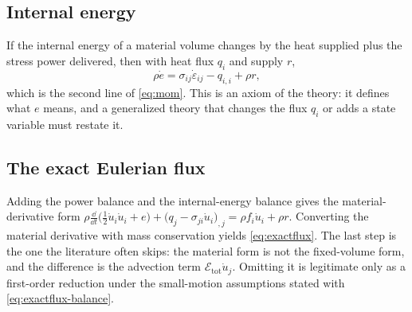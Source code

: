 \subsection*{Internal energy}\label{eq:bal-energy}
If the internal energy of a material volume changes by the heat supplied plus the stress power
delivered, then with heat flux $q_i$ and supply $r$,
\begin{equation}
\rho\dot e=\sigma_{ij}\dot\varepsilon_{ij}-q_{i,i}+\rho r ,
\end{equation}
which is the second line of \eqref{eq:mom}. This is an axiom of the theory: it defines what $e$ means, and
a generalized theory that changes the flux $q_i$ or adds a state variable must restate it.

\subsection*{The exact Eulerian flux}
Adding the power balance and the internal-energy balance gives the material-derivative form
$\rho\frac{\dd}{\dd t}\bigl(\tfrac12\dot u_i\dot u_i+e\bigr)+\bigl(q_j-\sigma_{ji}\dot u_i\bigr)_{,j}
=\rho f_i\dot u_i+\rho r$. Converting the material derivative with mass conservation yields
\eqref{eq:exactflux}. The last step is the one the literature often skips: the material form is not the
fixed-volume form, and the difference is the advection term $\mathcal E_{\mathrm{tot}}\dot u_j$.
Omitting it is legitimate only as a first-order reduction under the small-motion assumptions stated with
\eqref{eq:exactflux-balance}.
